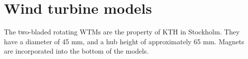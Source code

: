 \section{Wind turbine models}
The two-bladed rotating \gls{WTM}s are the property of KTH in Stockholm. They have a diameter of 45 mm, and a hub height of approximately 65 mm. Magnets are incorporated into the bottom of the models. 




